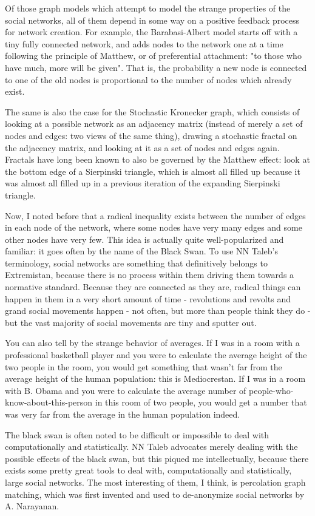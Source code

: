 \documentclass[12pt]{article}
\begin{document}
Of those graph models which attempt to model the strange properties of the social networks, all of them depend in some way on a positive feedback process for network creation. For example, the Barabasi-Albert model starts off with a tiny fully connected network, and adds nodes to the network one at a time following the principle of Matthew, or of preferential attachment: "to those who have much, more will be given". That is, the probability a new node is connected to one of the old nodes is proportional to the number of nodes which already exist. 

The same is also the case for the Stochastic Kronecker graph, which consists of looking at a possible network as an adjacency matrix (instead of merely a set of nodes and edges: two views of the same thing), drawing a stochastic fractal on the adjacency matrix, and looking at it as a set of nodes and edges again. Fractals have long been known to also be governed by the Matthew effect: look at the bottom edge of a Sierpinski triangle, which is almost all filled up because it was almost all filled up in a previous iteration of the expanding Sierpinski triangle.

Now, I noted before that a radical inequality exists between the number of edges in each node of the network, where some nodes have very many edges and some other nodes have very few. This idea is actually quite well-popularized and familiar: it goes often by the name of the Black Swan. To use NN Taleb's terminology, social networks are something that definitively belongs to Extremistan, because there is no process within them driving them towards a normative standard. Because they are connected as they are, radical things can happen in them in a very short amount of time - revolutions and revolts and grand social movements happen - not often, but more than people think they do - but the vast majority of social movements are tiny and sputter out.

You can also tell by the strange behavior of averages. If I was in a room with a professional basketball player and you were to calculate the average height of the two people in the room, you would get something that wasn't far from the average height of the human population: this is Mediocrestan. If I was in a room with B. Obama and you were to calculate the average number of people-who-know-about-this-person in this room of two people, you would get a number that was very far from the average in the human population indeed.

The black swan is often noted to be difficult or impossible to deal with computationally and statistically. NN Taleb advocates merely dealing with the possible effects of the black swan, but this piqued me intellectually, because there exists some pretty great tools to deal with, computationally and statistically, large social networks. The most interesting of them, I think, is percolation graph matching, which was first invented and used to de-anonymize social networks by A. Narayanan.
\end{document}

